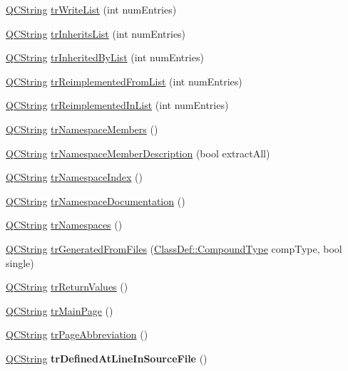 \begin{DoxyCompactItemize}
\item 
\hyperlink{class_q_c_string}{Q\-C\-String} \hyperlink{class_translator_italian_a1b5fbfc01a1bc458fe53a0292b4b7388}{tr\-Write\-List} (int num\-Entries)
\item 
\hyperlink{class_q_c_string}{Q\-C\-String} \hyperlink{class_translator_italian_a2aae6b7b421f034541d3890c830a5b87}{tr\-Inherits\-List} (int num\-Entries)
\item 
\hyperlink{class_q_c_string}{Q\-C\-String} \hyperlink{class_translator_italian_a1e99444f13f4aaf4381915a7ef64b7e2}{tr\-Inherited\-By\-List} (int num\-Entries)
\item 
\hyperlink{class_q_c_string}{Q\-C\-String} \hyperlink{class_translator_italian_a415a7fcbadfe96bd0ca26878e710c148}{tr\-Reimplemented\-From\-List} (int num\-Entries)
\item 
\hyperlink{class_q_c_string}{Q\-C\-String} \hyperlink{class_translator_italian_a03896d92ba89b64025ceb367fda22ffb}{tr\-Reimplemented\-In\-List} (int num\-Entries)
\item 
\hyperlink{class_q_c_string}{Q\-C\-String} \hyperlink{class_translator_italian_aab3cb0a2b1911abb6aaa26098a2ba334}{tr\-Namespace\-Members} ()
\item 
\hyperlink{class_q_c_string}{Q\-C\-String} \hyperlink{class_translator_italian_aee9c71c61972950fb45524dbecfa54f9}{tr\-Namespace\-Member\-Description} (bool extract\-All)
\item 
\hyperlink{class_q_c_string}{Q\-C\-String} \hyperlink{class_translator_italian_a3366fecf1ff5ff616f74822b96b0d9fb}{tr\-Namespace\-Index} ()
\item 
\hyperlink{class_q_c_string}{Q\-C\-String} \hyperlink{class_translator_italian_a4b378c543e22d6041d618cffdb734842}{tr\-Namespace\-Documentation} ()
\item 
\hyperlink{class_q_c_string}{Q\-C\-String} \hyperlink{class_translator_italian_abb4bb29699b00eecd57abd489abbffd0}{tr\-Namespaces} ()
\item 
\hyperlink{class_q_c_string}{Q\-C\-String} \hyperlink{class_translator_italian_a2c9f8ab8b1a6ef2b514ceaf4f2fbfcdb}{tr\-Generated\-From\-Files} (\hyperlink{class_class_def_a768a6f0a6fd7e9087ff7971abbcc3f36}{Class\-Def\-::\-Compound\-Type} comp\-Type, bool single)
\item 
\hyperlink{class_q_c_string}{Q\-C\-String} \hyperlink{class_translator_italian_a6e464db5f9409cf3e05373c732034db5}{tr\-Return\-Values} ()
\item 
\hyperlink{class_q_c_string}{Q\-C\-String} \hyperlink{class_translator_italian_a55afa9d76071992e385357f6cffb37ae}{tr\-Main\-Page} ()
\item 
\hyperlink{class_q_c_string}{Q\-C\-String} \hyperlink{class_translator_italian_a4248866912d235cac5f7336db70fff9a}{tr\-Page\-Abbreviation} ()
\item 
\hypertarget{class_translator_italian_adc253b88ffe7628a37260627a8c0b29a}{\hyperlink{class_q_c_string}{Q\-C\-String} {\bfseries tr\-Defined\-At\-Line\-In\-Source\-File} ()}\label{class_translator_italian_adc253b88ffe7628a37260627a8c0b29a}


\end{DoxyCompactItemize}
